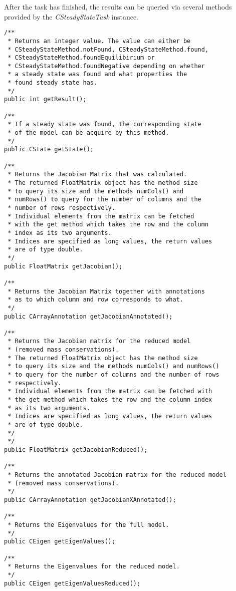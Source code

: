 \documentclass[a4,10pt]{article}
\begin{document}
After the task has finished, the results can be queried via several methods provided by the \textit{CSteadyStateTask} instance.

\begin{lstlisting}
/**
 * Returns an integer value. The value can either be
 * CSteadyStateMethod.notFound, CSteadyStateMethod.found,
 * CSteadyStateMethod.foundEquilibirium or
 * CSteadyStateMethod.foundNegative depending on whether 
 * a steady state was found and what properties the 
 * found steady state has.
 */
public int getResult();

/**
 * If a steady state was found, the corresponding state
 * of the model can be acquire by this method.
 */
public CState getState();

/**
 * Returns the Jacobian Matrix that was calculated.
 * The returned FloatMatrix object has the method size
 * to query its size and the methods numCols() and 
 * numRows() to query for the number of columns and the
 * number of rows respectively.
 * Individual elements from the matrix can be fetched
 * with the get method which takes the row and the column
 * index as its two arguments.
 * Indices are specified as long values, the return values
 * are of type double.
 */
public FloatMatrix getJacobian();

/**
 * Returns the Jacobian Matrix together with annotations
 * as to which column and row corresponds to what.
 */
public CArrayAnnotation getJacobianAnnotated();

/**
 * Returns the Jacobian matrix for the reduced model 
 * (removed mass conservations).
 * The returned FloatMatrix object has the method size
 * to query its size and the methods numCols() and numRows()
 * to query for the number of columns and the number of rows
 * respectively.
 * Individual elements from the matrix can be fetched with 
 * the get method which takes the row and the column index
 * as its two arguments.
 * Indices are specified as long values, the return values
 * are of type double.
 */
 */
public FloatMatrix getJacobianReduced();

/**
 * Returns the annotated Jacobian matrix for the reduced model 
 * (removed mass conservations).
 */
public CArrayAnnotation getJacobianXAnnotated();

/**
 * Returns the Eigenvalues for the full model.
 */
public CEigen getEigenValues();

/**
 * Returns the Eigenvalues for the reduced model.
 */
public CEigen getEigenValuesReduced();
\end{lstlisting}
\end{document}
